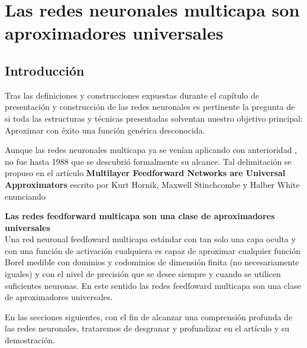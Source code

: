 %

\chapter{Las redes neuronales multicapa son aproximadores universales}  

\section{Introducción}  

Tras las definiciones y construcciones expuestas durante el capítulo de presentación 
y construcción de las redes neuronales 
es pertinente la pregunta de si toda las estructuras y técnicas presentadas solventan nuestro 
objetivo principal: Aproximar
con éxito una función genérica desconocida.   

Aunque las redes neuronales multicapa ya se venían aplicando con anterioridad \cite{4307059}, 
no fue hasta 1988 que se descubrió formalmente su alcance.
 Tal delimitación se propuso en el artículo \cite{HORNIK1989359}
\textbf{Multilayer Feedforward Networks are Universal Approximators}
 escrito por Kurt Hornik, Maxwell Stinchcombe y Halber White enunciando 

\begin{teorema}\textbf{Las redes feedforward multicapa son una clase de aproximadores universales } \label{teo:MFNAUA}
    \\
    Una red neuronal feedfoward multicapa estándar con tan solo una capa oculta y con una función de activación cualquiera es capaz de aproximar cualquier 
    función Borel medible  con dominios y codominios de dimensión finita (no necesariamente iguales) y con el nivel de precisión que se desee siempre y cuando 
    se utilicen suficientes neuronas. En este sentido las redes feedfoward multicapa son una clase de aproximadores universales.

\end{teorema}

En las secciones siguientes, con el fin de alcanzar una comprensión profunda de las redes neuronales,
trataremos de desgranar y profundizar en el artículo y su demostración. 

